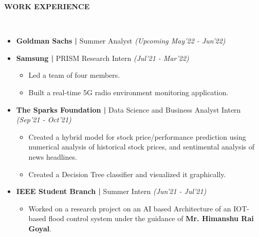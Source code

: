 \documentclass[a4paper,10pt]{article}
\newcommand{\lsep}{-0.5cm}
\newcommand{\resheading}[1]{{\small \colorbox{mygrey}{\begin{minipage}{0.975\textwidth}{\textbf{#1 \vphantom{p\^{E}}}}\end{minipage}}}}
\begin{document}
\resheading{\textbf{WORK EXPERIENCE} }\\[\lsep]
\begin{itemize}[itemsep=0.01mm, parsep=2pt]
\item \textbf{Goldman Sachs |} Summer Analyst \textit{(Upcoming May'22 - Jun'22)}
\item \textbf{Samsung |} PRISM Research Intern \textit{(Jul'21 - Mar'22)}
\begin{itemize}[itemsep=0.01mm, parsep=2pt]
\item Led a team of four members.
\item Built a real-time 5G radio environment monitoring application.
\end{itemize}
\item \textbf{The Sparks Foundation |} Data Science and Business Analyst Intern \textit{(Sep'21 - Oct'21)}
\begin{itemize}[itemsep=0.01mm, parsep=2pt]
\item Created a hybrid model for stock price/performance prediction using numerical analysis of historical stock prices, and sentimental analysis of news headlines.
\item Created a Decision Tree classifier and visualized it graphically.
\end{itemize}
\item \textbf{IEEE Student Branch |}  Summer Intern \textit{(Jun'21 - Jul'21)}
\begin{itemize}[itemsep=0.01mm, parsep=2pt]
\item Worked on a research project on an AI based Architecture of an IOT-based flood control system under the guidance of \textbf{Mr. Himanshu Rai Goyal}.
\end{itemize}
\end{itemize}
\end{document}
